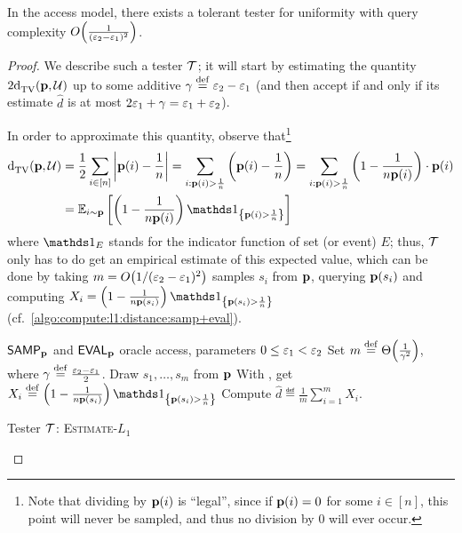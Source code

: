 \begin{theorem}\label{theorem:tolerant:tester:uniform}
In the \pdfsamp access model, there exists a tolerant tester for uniformity with query complexity $\bigO{\frac{1}{(\eps_2-\eps_1)^2}}$.
\end{theorem}
\begin{proof}
  We describe such a tester $\mathcal{T}$; it will start by estimating the quantity $2{\operatorname{d}_{\textrm{TV}}^{}\!\left({\mathbf{p}, \mathcal{U}}\right)}$ up to some additive $\gamma\stackrel{\rm def}{=}{\varepsilon_2-\varepsilon_1}$ (and then accept if and only if its estimate $\hat{d}$ is at most $2\varepsilon_1+\gamma = \varepsilon_1+\varepsilon_2$).
  
\noindent In order to approximate this quantity, observe that\footnote{Note that dividing by $\mathbf{p}(i)$ is ``legal'', since if $\mathbf{p}(i)=0$ for some $i\in[n]$, this point will never be sampled, and thus no division by $0$ will ever occur.}
  \begin{align}
  \totalvardist{\D}{\uniform} &= \frac{1}{2}\sum_{i\in[n]} \abs{\D(i)-\frac{1}{n}} = \sum_{i:\D(i)> \frac{1}{n} } \left(\D(i)-\frac{1}{n}\right) = \sum_{i:\D(i)> \frac{1}{n}} \left(1-\frac{1}{n\D(i)}\right)\cdot \D(i) \notag\\
  &= \shortexpect_{i\sim \D}\left[ \left(1 - \frac{1}{n\D(i)}\right)\indic{\D(i)> \frac{1}{n}} \right] \label{eq:trick:dtv:as:expectation}
  \end{align}
  where $\indicSet{E}$ stands for the indicator function of set (or event) $E$; thus, $\mathcal{T}$ only has to do get an empirical estimate of this expected value, which can be done by taking $m=\bigO{{1}/{(\eps_2-\eps_1)^2}}$ samples $s_i$ from $\mathbf{p}$, querying $\mathbf{p}(s_i)$ and computing $X_i = \left(1 - \frac{1}{n\D(s_i)}\right)\indic{\D(s_i)> \frac{1}{n}}$ (cf.~\cref{algo:compute:l1:distance:samp+eval}).
  \begin{algorithm}[h!]
    \begin{algorithmic}
      \Require ${\sf SAMP}_{\mathbf{p}}$ and ${\sf EVAL}_{\mathbf{p}}$ oracle access, parameters $0\leq \varepsilon_1 < \varepsilon_2$
      \State Set $m\eqdef\bigTheta{\frac{1}{\gamma^2}}$, where $\gamma\stackrel{\rm def}{=}\frac{\varepsilon_2-\varepsilon_1}{2}$.
      \State Draw $s_1,\dots,s_m$ from $\mathbf{p}$
        \State With \EVAL, get $X_i \eqdef \left(1 - \frac{1}{n\D(s_i)}\right)\indic{\D(s_i)> \frac{1}{n}}$
      \EndFor
      \State Compute $\hat{d}\eqdef \frac{1}{m} \sum_{i=1}^m X_i$.
          \State \Return\accept
      \Else
          \State \Return\reject
      \EndIf
    \end{algorithmic}
    \caption{\label{algo:compute:l1:distance:samp+eval}Tester $\mathcal{T}$: \textsc{Estimate-$L_1$} }
  \end{algorithm}


\end{proof}
